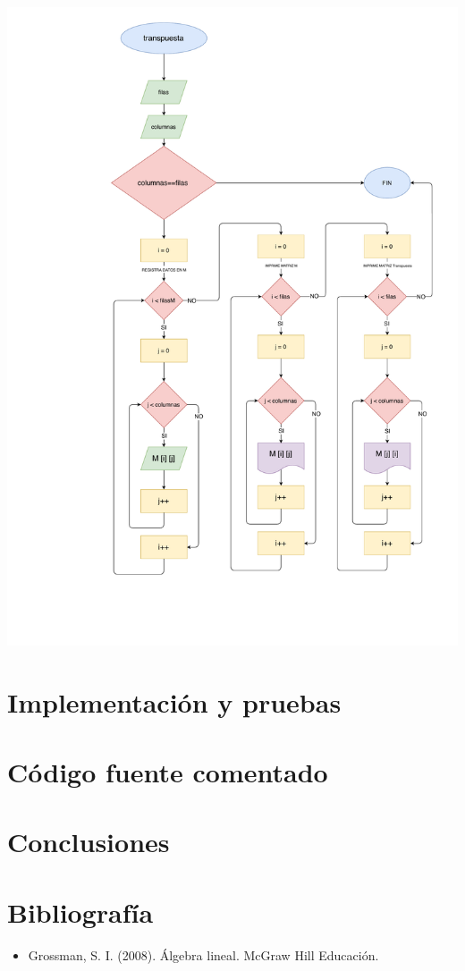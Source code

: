 \documentclass[letter]{revtex4}
\begin{document}
\begin{center}
 	\includegraphics[scale=0.6]{Images/Transpuesta.pdf}
 	\label{figura4}
 \end{center}
\clearpage

\section{Implementación y pruebas}
 

\section{Código fuente comentado}





\section{Conclusiones}


\section{Bibliografía}
\begin{itemize}
    \item Grossman, S. I. (2008). Álgebra lineal. McGraw Hill Educación.
\end{itemize}
\end{document}
